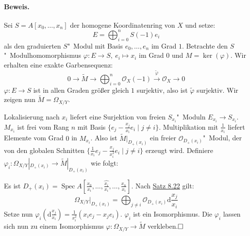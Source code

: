\documentclass[11pt,b5paper,openany]{memoir}
\def \qed {$\hfill\square$}
\begin{document}
\paragraph{Beweis.} Sei $S=A[x_0,\ldots,x_n]$ der homogene Koordinatenring von $X$ und setze:
\[E=\bigoplus_{i=0}^n S(-1)e_i\]
als den graduierten $S$"~Modul mit Basis $e_0,\ldots,e_n$ im Grad $1$. Betrachte den $S$"~Mo\-dul\-ho\-mo\-mor\-phis\-mus $\varphi:E\to S,\ e_i\mapsto x_i$ im Grad $0$ und $M=\ker(\varphi)$. Wir erhalten eine exakte Garbensequenz:
\[0\longrightarrow\widetilde{M}\longrightarrow\bigoplus_{i=0}^n\mathcal{O}_X(-1)\stackrel{\tilde{\varphi}}{\longrightarrow}\mathcal{O}_X\longrightarrow 0 \]
$\varphi:E\to S$ ist in allen Graden größer gleich $1$ surjektiv, also ist $\tilde{\varphi}$ surjektiv. Wir zeigen nun $\widetilde{M}=\Omega_{X/Y}$.

Lokalisierung nach $x_i$ liefert eine Surjektion von freien $S_{x_i}$"~Moduln $E_{x_i}\to S_{x_i}$. $M_{x_i}$ ist frei vom Rang $n$ mit Basis $\{e_j-\frac{x_j}{x_i}e_i\mid j\neq i\}$. Multiplikation mit $\frac{1}{x_i}$ liefert Elemente vom Grad $0$ in $M_{x_i}$. Also ist $\widetilde{M}|_{D_+(x_i)}$ ein freier $\mathcal{O}_{D_+(x_i)}$"~Modul, der von den globalen Schnitten $\{\frac{1}{x_i}e_j-\frac{x_j}{x_i^2}e_i\mid j\neq i \}$ erzeugt wird. Definiere $\varphi_i:\Omega_{X/Y}|_{D_+(x_i)}\to\widetilde{M}|_{D_+(x_i)}$ wie folgt:

Es ist $D_+(x_i)=\operatorname{Spec}A[\frac{x_0}{x_i},\ldots,\widehat{\frac{x_i}{x_i}},\ldots,\frac{x_n}{x_i}]$. Nach \hyperref[8.22]{Satz 8.22} gilt:
\[\Omega_{X/Y}|_{D_+(x_i)}=\bigoplus_{j\neq i}\mathcal{O}_{D_+(x_i)}\mathrm{d}\frac{x_j}{x_i} \]
Setze nun $\varphi_i(\mathrm{d}\frac{x_j}{x_i})=\frac{1}{x_i^2}(x_ie_j-x_je_i)$. $\varphi_i$ ist ein Isomorphismus. Die $\varphi_i$ lassen sich nun zu einem Isomorphismus $\varphi:\Omega_{X/Y}\to\widetilde{M}$ verkleben.\qed

\printindex
\end{document}
